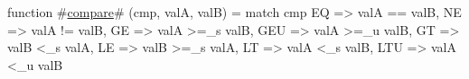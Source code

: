 function #\hyperref[zcompare]{compare}# (cmp, valA, valB) =
  match cmp {
    EQ   => valA ==   valB,
    NE   => valA !=   valB,
    GE   => valA >=_s valB,
    GEU  => valA >=_u valB,
    GT   => valB <_s  valA,
    LE   => valB >=_s valA,
    LT   => valA <_s  valB,
    LTU  => valA <_u  valB
  }
